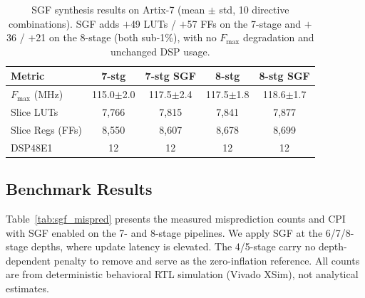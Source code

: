 \documentclass[acmsmall,nonacm,screen]{acmart}
\begin{document}
\begin{table}[t]
\centering
\caption{SGF synthesis results on Artix-7 (mean $\pm$ std, 10 directive combinations). SGF adds $+$49 LUTs / $+$57 FFs on the 7-stage and $+$36 / $+$21 on the 8-stage (both sub-1\%), with no $F_{\max}$ degradation and unchanged DSP usage.}
\label{tab:sgf_synth}
\small
\begin{tabular}{@{}lcccc@{}}
\toprule
\textbf{Metric} & \textbf{7-stg} & \textbf{7-stg SGF} & \textbf{8-stg} & \textbf{8-stg SGF} \\
\midrule
$F_{\max}$ (MHz)  & 115.0$\pm$2.0 & 117.5$\pm$2.4 & 117.5$\pm$1.8 & 118.6$\pm$1.7 \\
Slice LUTs        & 7{,}766       & 7{,}815       & 7{,}841       & 7{,}877 \\
Slice Regs (FFs)  & 8{,}550       & 8{,}607       & 8{,}678       & 8{,}699 \\
DSP48E1           & 12            & 12            & 12            & 12 \\
\bottomrule
\end{tabular}
\end{table}

\subsection{Benchmark Results}
\label{sec:sgf_bench}

Table~\ref{tab:sgf_mispred} presents the measured misprediction counts and CPI with SGF enabled on the 7- and 8-stage pipelines.
We apply SGF at the 6/7/8-stage depths, where update latency is elevated. The 4/5-stage carry no depth-dependent penalty to remove and serve as the zero-inflation reference.
All counts are from deterministic behavioral RTL simulation (Vivado XSim), not analytical estimates.
\end{document}
